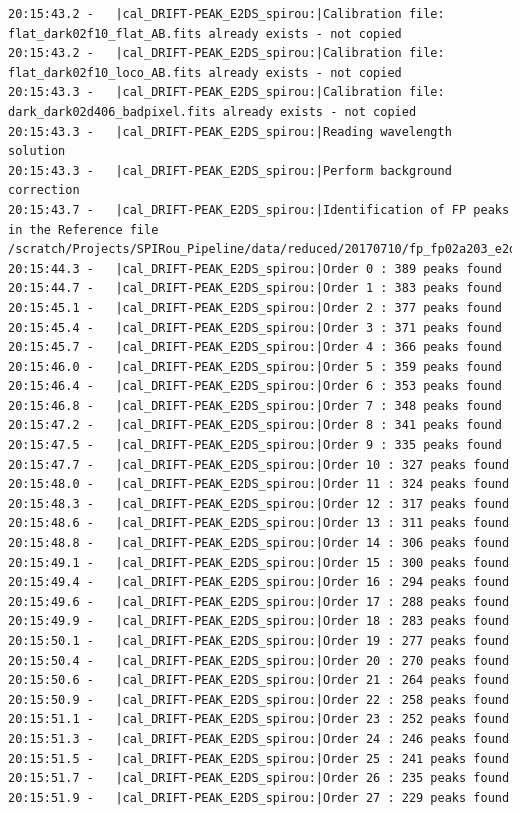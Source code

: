 \begin{lstlisting}[style=text]
20:15:43.2 -   |cal_DRIFT-PEAK_E2DS_spirou:|Calibration file: flat_dark02f10_flat_AB.fits already exists - not copied
20:15:43.2 -   |cal_DRIFT-PEAK_E2DS_spirou:|Calibration file: flat_dark02f10_loco_AB.fits already exists - not copied
20:15:43.3 -   |cal_DRIFT-PEAK_E2DS_spirou:|Calibration file: dark_dark02d406_badpixel.fits already exists - not copied
20:15:43.3 -   |cal_DRIFT-PEAK_E2DS_spirou:|Reading wavelength solution 
20:15:43.3 -   |cal_DRIFT-PEAK_E2DS_spirou:|Perform background correction 
20:15:43.7 -   |cal_DRIFT-PEAK_E2DS_spirou:|Identification of FP peaks in the Reference file  /scratch/Projects/SPIRou_Pipeline/data/reduced/20170710/fp_fp02a203_e2ds_AB.fits
20:15:44.3 -   |cal_DRIFT-PEAK_E2DS_spirou:|Order 0 : 389 peaks found
20:15:44.7 -   |cal_DRIFT-PEAK_E2DS_spirou:|Order 1 : 383 peaks found
20:15:45.1 -   |cal_DRIFT-PEAK_E2DS_spirou:|Order 2 : 377 peaks found
20:15:45.4 -   |cal_DRIFT-PEAK_E2DS_spirou:|Order 3 : 371 peaks found
20:15:45.7 -   |cal_DRIFT-PEAK_E2DS_spirou:|Order 4 : 366 peaks found
20:15:46.0 -   |cal_DRIFT-PEAK_E2DS_spirou:|Order 5 : 359 peaks found
20:15:46.4 -   |cal_DRIFT-PEAK_E2DS_spirou:|Order 6 : 353 peaks found
20:15:46.8 -   |cal_DRIFT-PEAK_E2DS_spirou:|Order 7 : 348 peaks found
20:15:47.2 -   |cal_DRIFT-PEAK_E2DS_spirou:|Order 8 : 341 peaks found
20:15:47.5 -   |cal_DRIFT-PEAK_E2DS_spirou:|Order 9 : 335 peaks found
20:15:47.7 -   |cal_DRIFT-PEAK_E2DS_spirou:|Order 10 : 327 peaks found
20:15:48.0 -   |cal_DRIFT-PEAK_E2DS_spirou:|Order 11 : 324 peaks found
20:15:48.3 -   |cal_DRIFT-PEAK_E2DS_spirou:|Order 12 : 317 peaks found
20:15:48.6 -   |cal_DRIFT-PEAK_E2DS_spirou:|Order 13 : 311 peaks found
20:15:48.8 -   |cal_DRIFT-PEAK_E2DS_spirou:|Order 14 : 306 peaks found
20:15:49.1 -   |cal_DRIFT-PEAK_E2DS_spirou:|Order 15 : 300 peaks found
20:15:49.4 -   |cal_DRIFT-PEAK_E2DS_spirou:|Order 16 : 294 peaks found
20:15:49.6 -   |cal_DRIFT-PEAK_E2DS_spirou:|Order 17 : 288 peaks found
20:15:49.9 -   |cal_DRIFT-PEAK_E2DS_spirou:|Order 18 : 283 peaks found
20:15:50.1 -   |cal_DRIFT-PEAK_E2DS_spirou:|Order 19 : 277 peaks found
20:15:50.4 -   |cal_DRIFT-PEAK_E2DS_spirou:|Order 20 : 270 peaks found
20:15:50.6 -   |cal_DRIFT-PEAK_E2DS_spirou:|Order 21 : 264 peaks found
20:15:50.9 -   |cal_DRIFT-PEAK_E2DS_spirou:|Order 22 : 258 peaks found
20:15:51.1 -   |cal_DRIFT-PEAK_E2DS_spirou:|Order 23 : 252 peaks found
20:15:51.3 -   |cal_DRIFT-PEAK_E2DS_spirou:|Order 24 : 246 peaks found
20:15:51.5 -   |cal_DRIFT-PEAK_E2DS_spirou:|Order 25 : 241 peaks found
20:15:51.7 -   |cal_DRIFT-PEAK_E2DS_spirou:|Order 26 : 235 peaks found
20:15:51.9 -   |cal_DRIFT-PEAK_E2DS_spirou:|Order 27 : 229 peaks found

\end{lstlisting}
